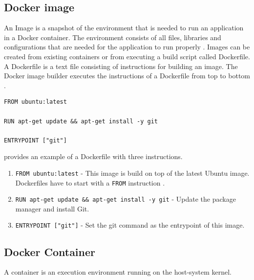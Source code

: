 \subsection{Docker image}
An Image is a snapshot of the environment that is needed to run an application in a Docker container. The environment consists of all files, libraries and configurations that are needed for the application to run properly \cite{Docker2020Docs, Nickoloff2019Docker}.
Images can be created from existing containers or from executing a build script called Dockerfile. A Dockerfile is a text file consisting of instructions for building an image. The Docker image builder executes the instructions of a Dockerfile from top to bottom \cite{Nickoloff2019Docker}.

\begin{lstlisting}[frame=single, label=lst:docker_dockerfile, caption=Example of a Dockerfile, captionpos=b]
FROM ubuntu:latest

RUN apt-get update && apt-get install -y git

ENTRYPOINT ["git"]
\end{lstlisting}

 provides an example of a Dockerfile with three instructions.
\begin{enumerate}
\item \texttt{FROM ubuntu:latest} - This image is build on top of the latest Ubuntu image. Dockerfiles have to start with a \texttt{FROM} instruction \cite{Nickoloff2019Docker}.
\item \texttt{RUN apt-get update \&\& apt-get install -y git} - Update the package manager and install Git.
\item \texttt{ENTRYPOINT ["git"]} - Set the git command as the entrypoint of this image.
\end{enumerate}



\subsection{Docker Container}
A container is an execution environment running on the host-system kernel.

